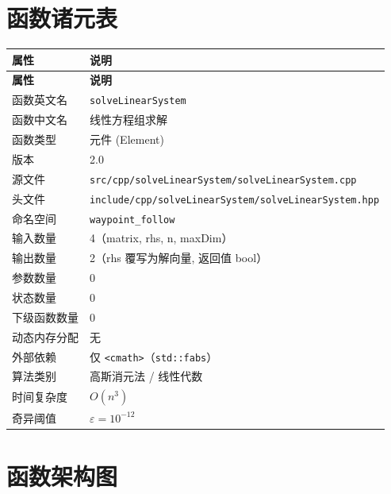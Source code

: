 \documentclass[a4paper,10pt]{article}
\begin{document}
\section{函数诸元表}

\renewcommand{\arraystretch}{1.3}
\begin{longtable}{|L{3.8cm}|L{11.5cm}|}
\hline
\textbf{属性} & \textbf{说明} \\
\hline
\endfirsthead
\hline
\textbf{属性} & \textbf{说明} \\
\hline
\endhead
函数英文名 & \texttt{solveLinearSystem} \\
\hline
函数中文名 & 线性方程组求解 \\
\hline
函数类型 & 元件 (Element) \\
\hline
版本 & 2.0 \\
\hline
源文件 & \texttt{src/cpp/solveLinearSystem/solveLinearSystem.cpp} \\
\hline
头文件 & \texttt{include/cpp/solveLinearSystem/solveLinearSystem.hpp} \\
\hline
命名空间 & \texttt{waypoint\_follow} \\
\hline
输入数量 & 4（matrix, rhs, n, maxDim） \\
\hline
输出数量 & 2（rhs 覆写为解向量, 返回值 bool） \\
\hline
参数数量 & 0 \\
\hline
状态数量 & 0 \\
\hline
下级函数数量 & 0 \\
\hline
动态内存分配 & 无 \\
\hline
外部依赖 & 仅 \texttt{<cmath>}（\texttt{std::fabs}） \\
\hline
算法类别 & 高斯消元法 / 线性代数 \\
\hline
时间复杂度 & $O(n^3)$ \\
\hline
奇异阈值 & $\varepsilon = 10^{-12}$ \\
\hline
\end{longtable}

\section{函数架构图}

\begin{center}
\end{center}
\end{document}
